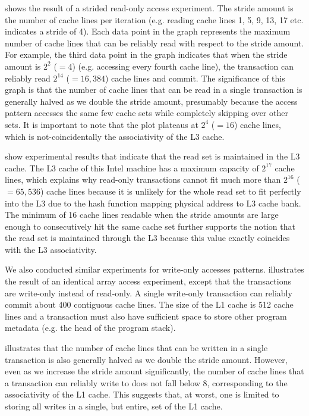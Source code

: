  shows the result of a strided read-only
access experiment. The stride amount is the number of cache lines per
iteration (e.g. reading cache lines 1, 5, 9, 13, 17 etc. 
indicates a stride of 4). Each data point in the graph 
represents the maximum number of cache
lines that can be reliably read with respect 
to the stride amount. For example,
the third data point in the graph indicates 
that when the stride amount is
$2^2$ ($=4$) (e.g. accessing every fourth cache line), 
the transaction can reliably read
$2^{14}$ ($=16,384$) cache lines and commit. 
The significance of this graph is that
the number of cache lines that can be read in a 
single transaction is generally
halved as we double the stride amount, presumably 
because the access pattern
accesses the same few cache sets while 
completely skipping over other sets.
It is important to note that the plot plateaus 
at $2^4$ ($=16$) cache lines, which is not-coincidentally
the associativity of the {L3} cache.

 show experimental results that indicate
that the read set is maintained in the
{L3} cache. The {L3} cache of this Intel machine has a maximum
capacity of $2^{17}$ cache lines, which explains 
why read-only transactions
cannot fit much more than $2^{16}$ ($=65,536$) 
cache lines because it is unlikely
for the whole read set to fit perfectly into the {L3} due to
the hash function mapping physical address to L3 cache bank. 
The minimum of 16
cache lines readable when the stride amounts 
are large enough to consecutively
hit the same cache set further supports the notion that the read set is
maintained through the {L3} because this value exactly coincides 
with the L3 associativity.

We also conducted similar experiments for write-only accesses
patterns.   illustrates 
the result of an
identical array access experiment, except that the 
transactions are write-only
instead of read-only. A single write-only transaction 
can reliably commit about 400 contiguous cache lines. The
size of the {L1} cache is 512 cache lines and a transaction must also
have sufficient space to store other program metadata (e.g. the
head of the program stack). 

 illustrates that the number of cache
lines that can be written in a single transaction 
is also generally halved as we
double the stride amount.  However, even as we increase the stride amount
significantly, the number of cache lines that a 
transaction can reliably write
to does not fall below 8, corresponding to the associativity 
of the L1 cache.  This suggests that, at worst, one is limited 
to storing all writes in a single, but entire, set of the L1 cache.

